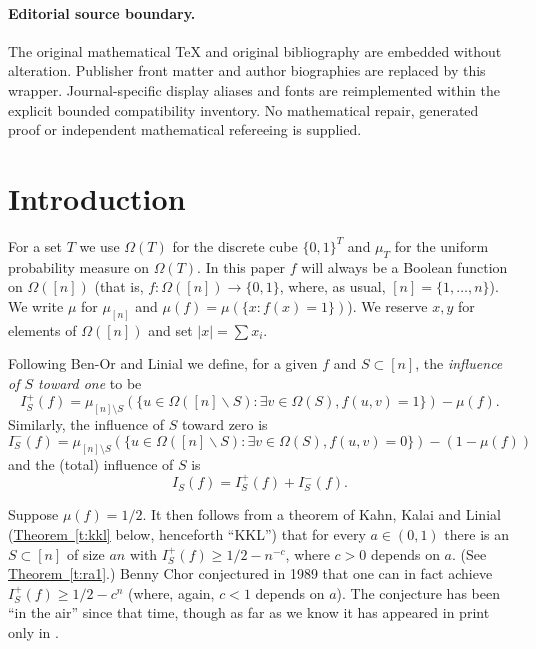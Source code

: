 \documentclass[11pt]{article}
\numberwithin{equation}{section}
\theoremstyle{definition}
\theoremstyle{plain}
\newcommand{\expref}[2]{\hyperref[#2]{#1~\ref{#2}}}
\newcommand{\beq}[1]{\begin{equation}\label{#1}}
\newcommand{\enq}[0]{\end{equation}}
\newcommand{\mn}[0]{\medskip\noindent}
\newcommand{\sm}[0]{\setminus}
\renewcommand{\dots}[0]{,\ldots,}
\newcommand{\0}[0]{\emptyset}
\newcommand{\gO}[0]{\Omega}
\begin{document}
\paragraph{Editorial source boundary.}
The original mathematical TeX and original bibliography are embedded without alteration. Publisher front matter and author biographies are replaced by this wrapper. Journal-specific display aliases and fonts are reimplemented within the explicit bounded compatibility inventory. No mathematical repair, generated proof or independent mathematical refereeing is supplied.
\clearpage

%
%
%


\section {Introduction}\label{Intro}

\mn


For a set $T$ we use $\Omega(T)$ for the discrete cube
$\{0,1\}^T$ and $\mu_T$ for the uniform probability measure
on $\Omega (T)$.
In this paper
$f$ will always be a Boolean function on $\gO([n])$
(that is, $f:\gO([n]) \to \{0,1\}$, where, as usual,
$[n]=\{1\dots n\}$).
We write $\mu$ for $\mu_{[n]}$ and
$\mu(f)= \mu (\{ x:f(x)= 1 \})$).
We reserve $x,y$ for elements of $\Omega([n])$
and set $|x| = \sum x_i$.





Following Ben-Or and Linial \cite {bl} we define,
for a given $f$ and
$S \subset [n]$, the \emph{influence of $S$ toward one}
to be
\beq{I+}
I^+_S(f) = \mu_{[n]\sm S}( \{u \in \Omega ([n]\backslash S):
\exists v \in \Omega(S), f(u,v)=1\})- \mu(f) .
\enq
Similarly, the influence of $S$ toward zero is
\beq{I-}
I^-_S(f) = \mu_{[n]\sm S}( \{u \in \Omega ([n]\backslash S):
\exists v \in \Omega(S), f(u,v)=0\})- (1-\mu(f) )
\enq
and the (total) influence of $S$ is
$$I_S(f)=I_S^+(f)+I_S^-(f).$$


Suppose $\mu(f) =1/2$.
It then follows from a theorem of Kahn, Kalai and Linial
\cite{kkl}
(\expref{Theorem}{t:kkl} below, henceforth ``KKL'')
that for every $a\in (0,1) $ there is an $S \subset [n]$ of size
$an$ with
$I^+_S(f)\ge 1/2-n^{-c}$, where $c>0$ depends on $a$.
(See \expref{Theorem}{t:ra1}.)
Benny Chor conjectured in 1989 \cite {benny} that one can in fact
achieve
$I^+_S(f)\ge 1/2-c^n$ (where, again, $c<1$ depends on $a$).
The conjecture has been ``in the air'' since that time,
though as far as we know
it has appeared in print only in
\cite{k:nati,Nati}.
\end{document}
